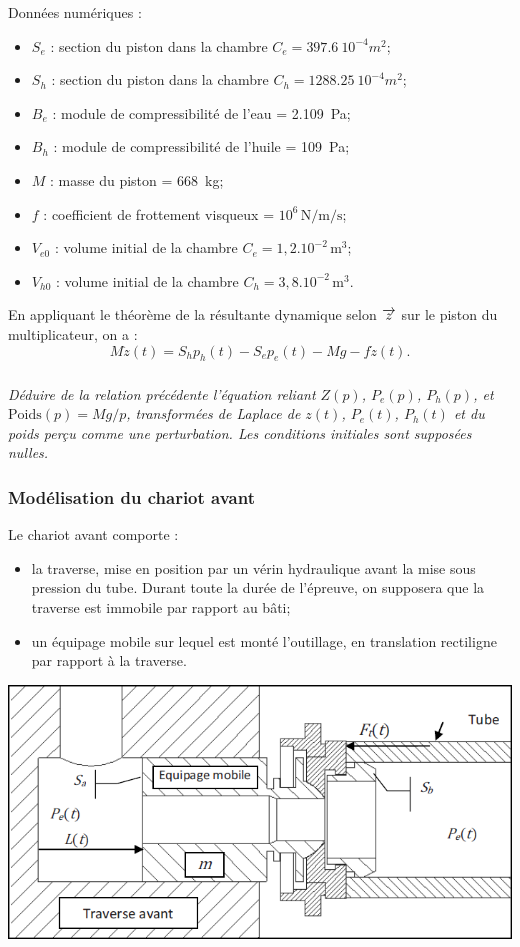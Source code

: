 \documentclass[10pt,fleqn]{article} %
\begin{document}
Données numériques : 
\begin{multicols}{2}
\begin{itemize}
\item $S_e$ :	section du piston dans la chambre $C_e = \SI{397,6}{10^{-4}m^2}$;
\item $S_h$ :	section du piston dans la chambre $C_h = \SI{1288,25}{10^{-4}m^2}$;
\item $B_e$ :	module de compressibilité de l’eau = \SI{2.109}{Pa};
\item $B_h$ :	module de compressibilité de l’huile = \SI{109}{Pa};
\item $M$ :	masse du piston = \SI{668}{kg};
\item $f$ :	coefficient de frottement visqueux = $10^6 \, \text{N/m/s}$;
\item $V_{e0}$ :	volume initial de la chambre $C_e =  1,2.10^{-2}\,\text{m}^3$;
\item $V_{h0}$ :	volume initial de la chambre $C_h = 3,8.10^{-2}\,\text{m}^3$.
\end{itemize}
\end{multicols}
En appliquant le théorème de la résultante dynamique selon $\overrightarrow{z}$ sur le piston du multiplicateur, on a : 
$$
M\ddot{z}(t)=S_hp_h(t)-S_ep_e(t)-Mg-f\dot{z}(t).
$$
\subparagraph{}
\textit{Déduire de la relation précédente l’équation reliant $Z(p)$, $P_e(p)$, $P_h(p)$, et $\text{Poids}(p)=Mg/p$, transformées de Laplace de $z(t)$, $P_e(t)$, $P_h(t)$ et du poids perçu comme une perturbation. Les conditions initiales sont supposées nulles.}

\subsubsection{Modélisation du chariot avant}
Le chariot avant comporte :
\begin{itemize}
\item la traverse, mise en position par un vérin hydraulique avant la mise sous pression du tube. Durant toute la durée de l’épreuve, on supposera que la traverse est immobile par rapport au bâti;
\item un équipage mobile sur lequel est monté l’outillage, en translation rectiligne par rapport à la traverse.
\end{itemize}



\begin{center}
\includegraphics[width=.8\linewidth]{images_02/fig_03}
\end{center}
\end{document}
